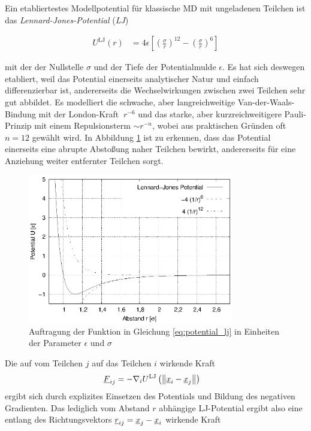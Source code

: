 		Ein etabliertestes Modellpotential für klassische MD mit ungeladenen Teilchen ist das
		\emph{Lennard-Jones-Potential} (\emph{LJ})

		\begin{align}
			U^\text{LJ}(r) &= 4\epsilon \left[
				\left(\frac{\sigma}{r}\right)^{12}
				-
				\left(\frac{\sigma}{r}\right)^{6}
			\right]
			\label{eq:potential_lj}
		\end{align}

		mit der der Nullstelle $\sigma$ und der Tiefe der Potentialmulde $\epsilon$. Es hat sich
		deswegen etabliert, weil das Potential einerseits analytischer Natur und einfach
		differenzierbar ist, andererseits die Wechselwirkungen zwischen zwei Teilchen sehr gut
		abbildet. Es modelliert die schwache, aber langreichweitige Van-der-Waals-Bindung mit der
		London-Kraft $~ r^{-6}$ und das starke, aber kurzreichweitigere Pauli-Prinzip mit einem
		Repulsionsterm $\sim r^{-n}$, wobei aus praktischen Gründen oft $n=12$ gewählt wird. In
		Abbildung \ref{fig:potential_lj} ist zu erkennen, dass das Potential einerseits eine
		abrupte Abstoßung naher Teilchen bewirkt, andererseits für eine Anziehung weiter
		entfernter Teilchen sorgt.

		\begin{figure}[!ht]
			\centering
			\includegraphics[width=0.8\textwidth]{chapter/main/theory/plt/lennard_jones.eps}
			\caption{Auftragung der Funktion in Gleichung \eqref{eq:potential_lj} in Einheiten
			der Parameter $\epsilon$ und $\sigma$}
			\label{fig:potential_lj}
		\end{figure}

		Die auf vom Teilchen $j$ auf das Teilchen $i$ wirkende Kraft
		\begin{align}
			\underline{F}_{ij} &= -\nabla_i U^\text{LJ}\left(
				\left\|\underline{x}_i - \underline{x}_j\right\|
			\right)
		\end{align}
		ergibt sich durch explizites Einsetzen des Potentials und Bildung des negativen Gradienten.
		Das lediglich vom Abstand $r$ abhängige LJ-Potential ergibt also eine entlang des
		Richtungsvektors $\underline{r}_{ij} = \underline{x}_j - \underline{x}_i$ wirkende Kraft

